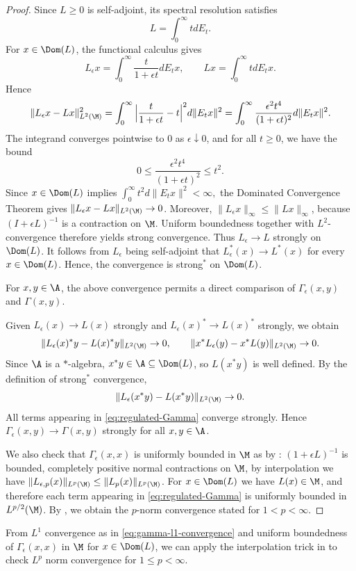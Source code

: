 \documentclass[sn-mathphys-num]{sn-jnl}
\begin{document}
\begin{proof}
Since $L\ge 0$ is self-adjoint, its spectral resolution satisfies
\[
L = \int_{0}^{\infty} t  dE_t .
\]
For $x\in\Dom(L)$, the functional calculus gives
\[
L_\epsilon x
= \int_{0}^{\infty} \frac{t}{1+\epsilon t}  dE_t x,
\qquad
L x
= \int_{0}^{\infty} t  dE_t x.
\]
Hence
\[
\|L_\epsilon x - Lx\|_{L^2(\M)}^{2}
= \int_{0}^{\infty}
   \Big|\frac{t}{1+\epsilon t} - t \Big|^{2}  d\|E_t x\|^{2}
= \int_{0}^{\infty}
   \frac{\epsilon^{2} t^{4}}{(1+\epsilon t)^{2}}  d\|E_t x\|^{2}.
\]
The integrand converges pointwise to $0$ as $\epsilon\downarrow 0$, and for
all $t\ge 0$, we have the bound
\[
0 \le \frac{\epsilon^{2} t^{4}}{(1+\epsilon t)^{2}} \le t^{2}.
\]
Since $x\in\Dom(L)$ implies $\int_{0}^{\infty} t^{2}  d\|E_t x\|^{2} < \infty,
$
the Dominated Convergence Theorem gives
$\|L_\epsilon x - Lx\|_{L^2(\M)}\to 0$.
Moreover, $\|L_\epsilon x\|_\infty\le\|Lx\|_\infty$,
because $(I+\epsilon L)^{-1}$ is a contraction on $\M$.
Uniform boundedness together with $L^2$-convergence therefore yields
strong convergence.
Thus $L_\epsilon \to L$ strongly on $\Dom(L)$.
It follows from $L_\epsilon$ being self-adjoint that
$L_\epsilon^* (x) \to L^* (x)$ for every $x\in\Dom(L)$. Hence, the convergence
is strong$^*$ on $\Dom(L)$.

For $x,y\in\A$, the above convergence permits a direct comparison of $ \Gamma_\epsilon(x,y)$ and $ \Gamma(x,y)$.

Given $  L_\epsilon(x)\to   L(x)$ strongly and $  L_\epsilon(x)^*\to   L(x)^*$ strongly, we obtain
\[
\|  L_\epsilon(x)^* y -   L(x)^* y\|_{L^2( {\M})}\to 0,
\qquad
\|x^*   L_\epsilon(y) - x^*   L(y)\|_{L^2( {\M})}\to 0 .
\]
Since $\A$ is a $*$-algebra, $x^* y \in \A \subseteq \Dom(  L)$, so $  L(x^*y)$ is well defined. By the definition of strong$^*$ convergence,
\[
\|  L_\epsilon(x^* y) -   L(x^* y)\|_{L^2( {\M})}\to 0 .
\]
All terms appearing in \cref{eq:regulated-Gamma} converge strongly. Hence $ \Gamma_\epsilon(x,y)\to  \Gamma(x,y)$ strongly for all $x,y\in\A$.

We also check that $\Gamma_\epsilon(x,x)$ is uniformly bounded in $\M$ as by \cite[Prop~2.5]{cipriani_derivations_2003}: $(1+\epsilon L)^{-1}$ is bounded, completely positive normal contractions on $\M$, by interpolation we have $\|L_{\epsilon,p}(x)\|_{L^p(\M)}\le \|L_p(x)\|_{L^p(\M)}$. For $x\in\Dom(L)$ we have $L(x)\in\M$, and therefore each term appearing in
\cref{eq:regulated-Gamma} is uniformly bounded in $L^{p/2}(\M)$.
By , we obtain the $p$-norm convergence stated for $1<p<\infty$.
\end{proof}
\begin{remark}\label{rmk:unif-bdd}
From $L^1$ convergence as in \cref{eq:gamma-l1-convergence} and uniform boundedness of $\Gamma_\epsilon(x,x)$ in $\M$ for $x\in\Dom(L)$, we can apply the interpolation trick in \cite{Junge2002Doobs} to check $L^{p}$ norm convergence for $1\le p<\infty$.
\end{remark}
\end{document}
